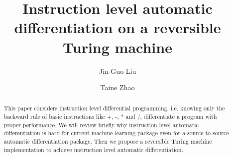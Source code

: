 \documentclass[aps,twocolumn,longbibliography,english,superscriptaddress,prr]{revtex4-1}
\newcommand{\<}{\langle}
\renewcommand{\>}{\rangle}
\theoremstyle{definition}\newtheorem{definition}{\textit{Definition}}
\begin{document}
\title{Instruction level automatic differentiation on a reversible Turing machine}


\author{Jin-Guo Liu}

\author{Taine Zhao}

\begin{abstract}
    This paper considers instruction level differential programming, i.e. knowing only the backward rule of basic instructions like +, -, * and /, differentiate a program with proper performance. We will review briefly why instruction level automatic differentiation is hard for current machine learning package even for a source to source automatic differentiation package. Then we propose a reversible Turing machine implementation to achieve instruction level automatic differentiation.
\end{abstract}


\maketitle

\end{document}
